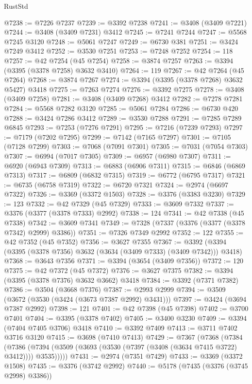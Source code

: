 \begin{lexlean}{RustStd}
\begin{coremodule}
@7238 := @7226 @7237
@7239 := @3392 @7238
@7241 := @3408 (@3409 @7221)
@7244 := @3408 (@3409 @7231) @3412
@7245 := @7241 @7244
@7247 := @5568 @7245 @3120
@7248 := @5061 @7247
@7249 := @6730 @381
@7251 := @3424 @7249 @3412
@7252 := @3530 @7251
@7253 := @7248 @7252
@7254 := 118
@7257 := @42 @7254 (@45 @7254)
@7258 := @3874 @7257
@7263 := @3394 (@3395 (@3378 @7258) @3632 @3410)
@7264 := 119
@7267 := @42 @7264 (@45 @7264)
@7268 := @3874 @7267
@7274 := @3394 (@3395 (@3378 @7268) @3632 @5427) @3418
@7275 := @7263 @7274
@7276 := @3392 @7275
@7278 := @3408 (@3409 @7258)
@7281 := @3408 (@3409 @7268) @3412
@7282 := @7278 @7281
@7284 := @5568 @7282 @3120
@7285 := @5061 @7284
@7286 := @6730 @420
@7288 := @3424 @7286 @3412
@7289 := @3530 @7288
@7291 := @7285 @7289 @6845
@7293 := @7253 (@7276 @7291)
@7295 := @7216 (@7239 @7293)
@7297 := @7179 (@7202 @7295)
@7299 := @7142 (@7165 @7297)
@7301 := @7105 (@7128 @7299)
@7303 := @7068 (@7091 @7301)
@7305 := @7031 (@7054 @7303)
@7307 := @6994 (@7017 @7305)
@7309 := @6957 (@6980 @7307)
@7311 := @6920 (@6943 @7309)
@7313 := @6883 (@6906 @7311)
@7315 := @6846 (@6869 @7313)
@7317 := @6809 (@6832 @7315)
@7319 := @6772 (@6795 @7317)
@7321 := @6735 (@6758 @7319)
@7322 := @6720 @7321
@7324 := @2974 (@6697 @7322)
@7326 := @3369 (@3372 @1503)
@7328 := @3376 (@3383 @3230)
@7329 := 123
@7332 := @42 @7329 (@45 @7329)
@7333 := @3609 @7332
@7337 := @3376 (@3377 (@3378 @7333) @2992)
@7338 := 124
@7341 := @42 @7338 (@45 @7338)
@7342 := @3609 @7341
@7349 := @7328 (@7337 (@3376 (@3377 (@3378 @7342) @2999) @3386))
@7351 := @7326 @7349 @2992
@7352 := 122
@7355 := @42 @7352 (@45 @7352)
@7356 := @3627 @7355
@7367 := @3392 (@3394 (@3395 (@3378 @7356) @3632 (@3634 (@3409 @7333) (@3409 @7342))) @3418)
@7368 := @3643 @7356
@7371 := @3394 (@3654 (@3409 @7356))
@7372 := 120
@7375 := @42 @7372 (@45 @7372)
@7376 := @3627 @7375
@7382 := @3394 (@3395 (@3378 @7376) @3632 @3662) @3418
@7384 := @3392 (@7371 @7382)
@7386 := @3504 (@3668 @7376)
@7387 := @2993 @2999
@7394 := @3509 (@3672 (@3530 (@3424 (@3673 @7387 @2992) @3431)))
@7397 := @3424 (@3694 @7387 @2992)
@7398 := 121
@7401 := @42 @7398 (@45 @7398)
@7402 := @3700 @7401
@7404 := @3395 (@3378 @7402)
@7405 := @3400 @3230
@7409 := @3394 (@7404 @7405 @3706) @3418
@7410 := @3392 @7409
@7413 := @3711 @7402 @3716 @3120
@7415 := @3698 (@7410 @7413)
@7429 := @7367
    (@7368
      (@7384
        (@7386 (@7394 (@3509 (@3693 (@3530 (@7397 (@3408 (@3634 @7415 @3722) @3412)))) @3535)))))
@7431 := @2974 (@7351 @7429)
@7433 := @3369 (@3372 @1508)
@7435 := @3376 (@3742 @2992)
@7440 := @5178 (@7435 (@3376 (@3745 @2998) @3386))

\end{coremodule}
\end{lexlean}
